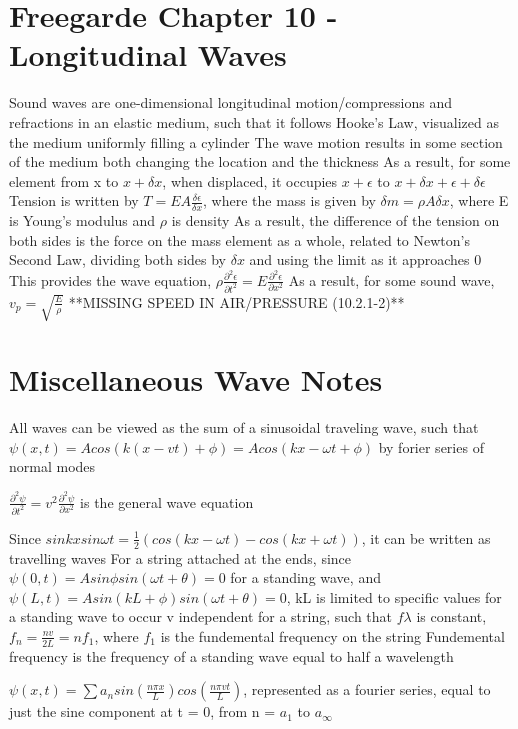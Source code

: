 \documentclass[11 pt, twoside]{article}
\newenvironment{outline*}
{
	\begin{outline}[enumerate]
	}
	{\end{outline}
}
\begin{document}
\section{Freegarde Chapter 10 - Longitudinal Waves}
\begin{outline*}
\1 Sound waves are one-dimensional longitudinal motion/compressions and refractions in an elastic medium, such that it follows Hooke's Law, visualized as the medium uniformly filling a cylinder
\2 The wave motion results in some section of the medium both changing the location and the thickness
\2 As a result, for some element from x to $x + \delta x$, when displaced, it occupies $x + \epsilon$ to $x + \delta x + \epsilon + \delta\epsilon$
\3 Tension is written by $T = EA\frac{\delta\epsilon}{\delta x}$, where the mass is given by $\delta m = \rho A \delta x$, where E is Young's modulus and $\rho$ is density
\3 As a result, the difference of the tension on both sides is the force on the mass element as a whole, related to Newton's Second Law, dividing both sides by $\delta x$ and using the limit as it approaches 0
\3 This provides the wave equation, $\rho\frac{\partial^2 \epsilon}{\partial t^2} = E\frac{\partial^2 \epsilon}{\partial x^2}$
\2 As a result, for some sound wave, $v_p = \sqrt{\frac{E}{\rho}}$
\1 **MISSING SPEED IN AIR/PRESSURE (10.2.1-2)**
\end{outline*}
\section{Miscellaneous Wave Notes}
All waves can be viewed as the sum of a sinusoidal traveling wave, such that $\psi(x, t) = Acos(k(x-vt) + \phi) = Acos(kx - \omega t + \phi)$ by forier series of normal modes

$\frac{\partial^2 \psi}{\partial t^2} = v^2\frac{\partial^2 \psi}{\partial x^2}$ is the general wave equation

Since $sinkxsin\omega t = \frac{1}{2}(cos(kx - \omega t) - cos(kx + \omega t))$, it can be written as travelling waves
For a string attached at the ends, since $\psi(0, t) = Asin\phi sin(\omega t + \theta) = 0$ for a standing wave, and $\psi(L, t) = Asin(kL + \phi)sin(\omega t + \theta) = 0$, kL is limited to specific values for a standing wave to occur
v independent for a string, such that $f\lambda$ is constant, $f_n = \frac{nv}{2L} = nf_1$, where $f_1$ is the fundemental frequency on the string
Fundemental frequency is the frequency of a standing wave equal to half a wavelength

$\psi(x, t) = \sum a_n sin(\frac{n\pi x}{L})cos(\frac{n\pi vt}{L})$, represented as a fourier series, equal to just the sine component at t = 0, from n = $a_1$ to $a_{\infty}$
\end{document}

